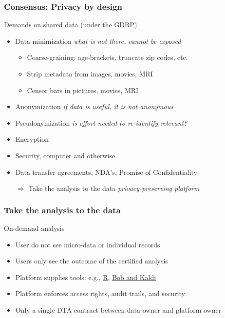 \documentclass[xcolor=dvipsnames]{beamer}
\begin{document}
\begin{frame}
	\frametitle{Consensus: Privacy by design}
	
	\begin{block}{Demands on shared data (under the GDRP)}
	\begin{itemize}
	\item Data minimization {\hspace{2cm} \small \em what is not there, cannot be exposed}
	\begin{itemize}
	\item Coarse-graining: age-brackets, truncate zip codes, etc.
	\item Strip metadata from images, movies, MRI
	\item Censor bars in pictures, movies, MRI 
	\end{itemize}
	\item Anonymization {\hspace{2.6cm} \small \em if data is useful, it is not anonymous}
	\item Pseudonymization {\hspace{2cm} \small \em is effort needed to re-identify relevant?}
	\item Encryption
	\item Security, computer and otherwise
	\item Data transfer agreements, NDA's, Promise of Confidentiality
	\item[$\Rightarrow$] {\color{Maroon}Take the analysis to the data} {\hspace{2cm} \small \em privacy-preserving platform}
	\end{itemize}
	\end{block}	

\end{frame}

\begin{frame}
	\frametitle{Take the analysis to the data}
	
	\begin{block}{On-demand analysis}
	\begin{itemize}
	\item User do not see micro-data or individual records
	\item Users only see the outcome of the certified analysis
	\item Platform supplies tools: e.g., \href{https://www.ncbi.nlm.nih.gov/pmc/articles/PMC4276062/}{\color{blue} R}, \href{http://publications.idiap.ch/downloads/papers/2017/Cernak_INTERSPEECH_2017.pdf}{\color{blue} Bob and Kaldi} {\scriptsize\cite{cernak2017bob,DataSHIELD2014:short}}
	\item Platform enforces access rights, audit trails, and security
	\item Only a single DTA contract between data-owner and platform owner
	\end{itemize}
	\end{block}	
\end{frame}
\end{document}
